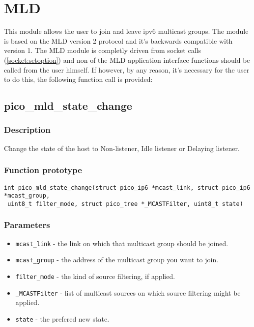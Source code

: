 \section{MLD}

This module allows the user to join and leave ipv6 multicast groups. The module is based on the MLD version 2 protocol and it's backwards compatible with version 1. 
The MLD module is completly driven from socket calls (\ref{socket:setoption}) and non of the MLD application interface functions should be called from the user himself. If however, by any reason, it's necessary for the user to do this, the following function call is provided:

\subsection{pico\_mld\_state\_change}

\subsubsection*{Description}
Change the state of the host to Non-listener, Idle listener or Delaying listener.

\subsubsection*{Function prototype}
\begin{verbatim}
int pico_mld_state_change(struct pico_ip6 *mcast_link, struct pico_ip6 *mcast_group,
 uint8_t filter_mode, struct pico_tree *_MCASTFilter, uint8_t state)
\end{verbatim}

\subsubsection*{Parameters}
\begin{itemize}[noitemsep]
\item \texttt{mcast\_link} - the link on which that multicast group should be joined.
\item \texttt{mcast\_group} - the address of the multicast group you want to join.
\item \texttt{filter\_mode} - the kind of source filtering, if applied.
\item \texttt{\_MCASTFilter} - list of multicast sources on which source filtering might be applied. 
\item \texttt{state} - the prefered new state.
\end{itemize}

